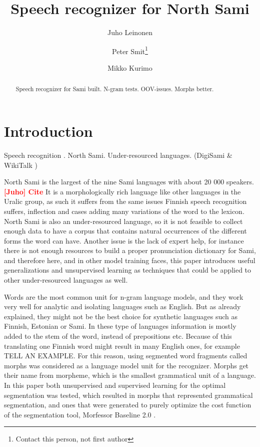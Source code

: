 \documentclass[10pt,b5paper]{article}
\newcommand{\todo}[2]{{\textcolor{red}{\bf [#1] #2 }}}
\begin{document}
\title{Speech recognizer for North Sami} \author{Juho Leinonen \and Peter Smit\footnote{Contact this person, not first author} \and Mikko Kurimo} \maketitle

\begin{abstract} Speech recognizer for Sami built. N-gram tests. OOV-issues. Morphs better. \end{abstract}

\section{Introduction}

Speech recognition \cite{huang2001spoken}. North Sami. Under-resourced languages. (DigiSami \& WikiTalk \cite{wilcock2013wikitalk}\cite{jokinen2014multimodal}\cite{jokinen2014open})

North Sami is the largest of the nine Sami languages with about 20 000 speakers. \todo{Juho}{Cite}  It is a morphologically rich language like other languages in the Uralic group, as such it suffers from the same issues Finnish speech recognition suffers, inflection and cases adding many variations of the word to the lexicon. North Sami is also an under-resourced language, so it is not feasible to collect enough data to have a corpus that contains natural occurrences of the different forms the word can have. Another issue is the lack of expert help, for instance there is not enough resources to build a proper pronunciation dictionary for Sami, and therefore here, and in other model training faces, this paper introduces useful generalizations and unsupervised learning as techniques that could be applied to other under-resourced languages as well.

Words are the most common unit for n-gram language models, and they work very well for analytic and isolating languages such as English. But as already explained, they might not be the best choice for synthetic languages such as Finnish, Estonian or Sami. In these type of languages information is mostly added to the stem of the word, instead of prepositions etc. Because of this translating one Finnish word might result in many English ones, for example TELL AN EXAMPLE. For this reason, using segmented word fragments called morphs was considered as a language model unit for the recognizer. Morphs get their name from morpheme, which is the smallest grammatical unit of a language. In this paper both unsupervised and supervised learning for the optimal segmentation was tested, which resulted in morphs that represented grammatical segmentation, and ones that were generated to purely optimize the cost function of the segmentation tool, Morfessor Baseline 2.0 \cite{virpioja2013morfessor}. 
\end{document}
